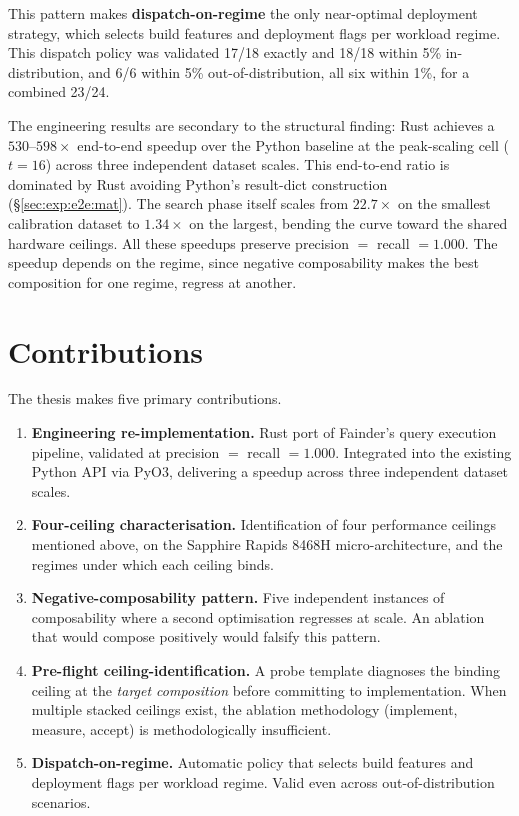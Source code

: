 This pattern makes \textbf{dispatch-on-regime} the only near-optimal deployment strategy, which selects build features and deployment flags per workload regime. This dispatch policy was validated 17/18 exactly and 18/18 within 5\% in-distribution, and 6/6 within 5\% out-of-distribution, all six within 1\%, for a combined 23/24.

The engineering results are secondary to the structural finding: Rust achieves a $530$--$598\times$ end-to-end speedup over the Python baseline at the peak-scaling cell ($t=16$) across three independent dataset scales. This end-to-end ratio is dominated by Rust avoiding Python's result-dict construction (§\ref{sec:exp:e2e:mat}). The search phase itself scales from $22.7\times$ on the smallest calibration dataset to $1.34\times$ on the largest, bending the curve toward the shared hardware ceilings. All these speedups preserve precision $=$ recall $= 1.000$. The speedup depends on the regime, since negative composability makes the best composition for one regime, regress at another.

\section{Contributions}

The thesis makes five primary contributions.

\begin{enumerate}
    \item \textbf{Engineering re-implementation.} Rust port of Fainder's query execution pipeline, validated at precision $=$ recall $= 1.000$. Integrated into the existing Python API via PyO3, delivering a speedup across three independent dataset scales.
    
    \item \textbf{Four-ceiling characterisation.} Identification of four performance ceilings mentioned above, on the Sapphire Rapids 8468H micro-architecture, and the regimes under which each ceiling binds. 

    \item \textbf{Negative-composability pattern.} Five independent instances of composability where a second optimisation regresses at scale. An ablation that would compose positively would falsify this pattern.

    \item \textbf{Pre-flight ceiling-identification.} A probe template diagnoses the binding ceiling at the \emph{target composition} before committing to implementation. When multiple stacked ceilings exist, the ablation methodology (implement, measure, accept) is methodologically insufficient.
    
    \item \textbf{Dispatch-on-regime.} Automatic policy that selects build features and deployment flags per workload regime. Valid even across out-of-distribution scenarios.
\end{enumerate}

